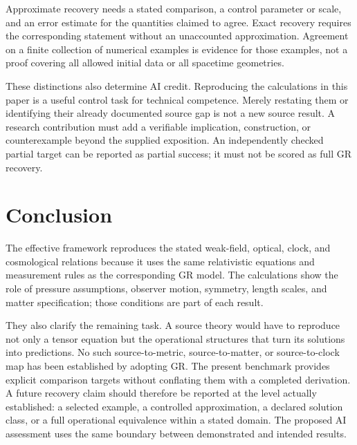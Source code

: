 \documentclass[11pt,oneside]{report}
\newcommand{\ArticleShort}{}
\theoremstyle{remark}
\numberwithin{definition}{chapter}
\numberwithin{proposition}{chapter}
\numberwithin{remark}{chapter}
\begin{document}
Approximate recovery needs a stated comparison, a control parameter or scale, and an error estimate for the quantities claimed to agree. Exact recovery requires the corresponding statement without an unaccounted approximation. Agreement on a finite collection of numerical examples is evidence for those examples, not a proof covering all allowed initial data or all spacetime geometries.

These distinctions also determine AI credit. Reproducing the calculations in this paper is a useful control task for technical competence. Merely restating them or identifying their already documented source gap is not a new source result. A research contribution must add a verifiable implication, construction, or counterexample beyond the supplied exposition. An independently checked partial target can be reported as partial success; it must not be scored as full GR recovery.

\section{Conclusion}
The effective framework reproduces the stated weak-field, optical, clock, and cosmological relations because it uses the same relativistic equations and measurement rules as the corresponding GR model. The calculations show the role of pressure assumptions, observer motion, symmetry, length scales, and matter specification; those conditions are part of each result.

They also clarify the remaining task. A source theory would have to reproduce not only a tensor equation but the operational structures that turn its solutions into predictions. No such source-to-metric, source-to-matter, or source-to-clock map has been established by adopting GR. The present benchmark provides explicit comparison targets without conflating them with a completed derivation.
A future recovery claim should therefore be reported at the level actually established: a selected example, a controlled approximation, a declared solution class, or a full operational equivalence within a stated domain. The proposed AI assessment uses the same boundary between demonstrated and intended results.

\clearpage
\renewcommand{\ArticleShort}{Geometry}
\end{document}
